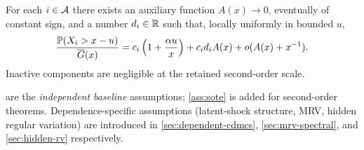 \begin{assumption}
\label{ass:sote}
For each \(i\in\mathcal{A}\) there exists an auxiliary function \(A(x)\to 0\),
eventually of constant sign, and a number \(d_i\in\mathbb{R}\) such that, locally
uniformly in bounded \(u\),
\[
  \frac{\mathbb{P}(X_i>x-u)}{\overline{G}(x)}
  = c_i\left(1+\frac{\alpha u}{x}\right)
    + c_i d_i A(x) + o(A(x)+x^{-1}).
\]
Inactive components are negligible at the retained second-order scale.
\end{assumption}

 are the
\emph{independent baseline} assumptions; \cref{ass:sote} is added for
second-order theorems. Dependence-specific assumptions (latent-shock structure,
MRV, hidden regular variation) are introduced in \cref{sec:dependent-cdmcs},
\cref{sec:mrv-spectral}, and \cref{sec:hidden-rv} respectively.
